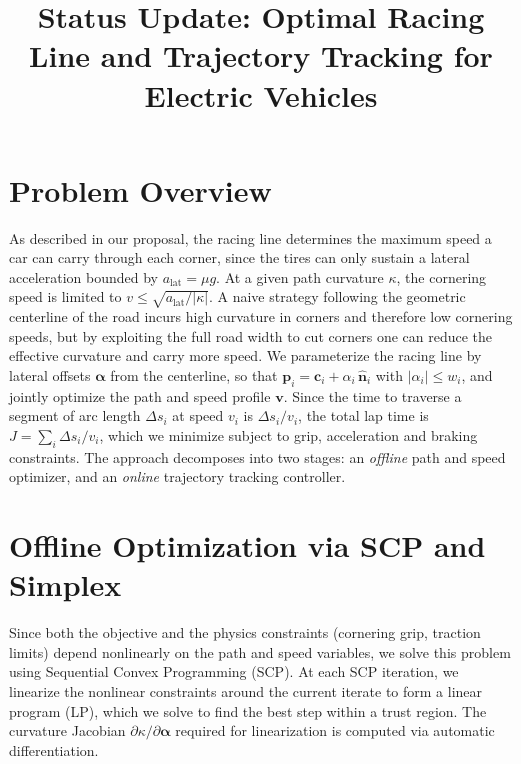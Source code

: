 \documentclass[twoside,11pt]{article}
\begin{document}
\title{Status Update: Optimal Racing Line and Trajectory Tracking for Electric Vehicles}
\newcommand{\shorttitle}{EV Racing --- Status Update}



\maketitle
\enlargethispage{0.8in}
\vspace{-0.15in}

\section{Problem Overview}
\vspace{-0.08in}

As described in our proposal, the racing line determines the maximum speed a car can carry through each corner, since the tires can only sustain a lateral acceleration bounded by $a_{\text{lat}} = \mu g$. At a given path curvature $\kappa$, the cornering speed is limited to $v \leq \sqrt{a_{\text{lat}}/|\kappa|}$. A naive strategy following the geometric centerline of the road incurs high curvature in corners and therefore low cornering speeds, but by exploiting the full road width to cut corners one can reduce the effective curvature and carry more speed. We parameterize the racing line by lateral offsets $\boldsymbol{\alpha}$ from the centerline, so that $\mathbf{p}_i = \mathbf{c}_i + \alpha_i\,\hat{\mathbf{n}}_i$ with $|\alpha_i| \leq w_i$, and jointly optimize the path and speed profile $\mathbf{v}$. Since the time to traverse a segment of arc length $\Delta s_i$ at speed $v_i$ is $\Delta s_i / v_i$, the total lap time is $J = \sum_i \Delta s_i / v_i$, which we minimize subject to grip, acceleration and braking constraints. The approach decomposes into two stages: an \emph{offline} path and speed optimizer, and an \emph{online} trajectory tracking controller.

\vspace{-0.05in}
\section{Offline Optimization via SCP and Simplex}
\vspace{-0.08in}

Since both the objective and the physics constraints (cornering grip, traction limits) depend nonlinearly on the path and speed variables, we solve this problem using Sequential Convex Programming (SCP). At each SCP iteration, we linearize the nonlinear constraints around the current iterate to form a linear program (LP), which we solve to find the best step within a trust region. The curvature Jacobian $\partial \kappa / \partial \boldsymbol{\alpha}$ required for linearization is computed via automatic differentiation.
\end{document}

